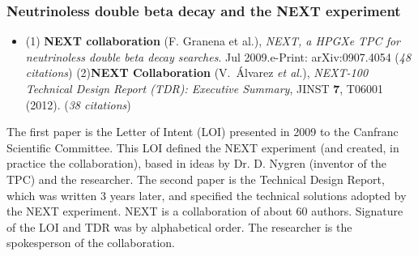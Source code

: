 %

\subsubsection*{Neutrinoless double beta decay and the NEXT experiment}
\begin{itemize}
\item	(1) {\bf NEXT collaboration} (F. Granena et al.), \textit{NEXT, a HPGXe TPC for neutrinoless double beta decay searches}. Jul 2009.e-Print: arXiv:0907.4054 ({\it 48 citations}) 
(2){\bf NEXT Collaboration} (V.~\'Alvarez {\it et al.}), \textit{NEXT-100 Technical Design Report (TDR): Executive Summary}, JINST {\bf 7}, T06001 (2012). ({\it 38 citations})
\end{itemize}

The first paper is the Letter of Intent (LOI) presented in 2009 to the Canfranc Scientific Committee. This LOI defined the NEXT experiment (and created, in practice the collaboration), based in ideas by Dr. D. Nygren (inventor of the TPC) and the researcher. The second paper is the Technical Design Report, which was written 3 years later, and specified the technical solutions adopted by the NEXT experiment. NEXT is a collaboration of about 60 authors. Signature of the LOI and TDR was by alphabetical order. The researcher is the spokesperson of the collaboration. 


